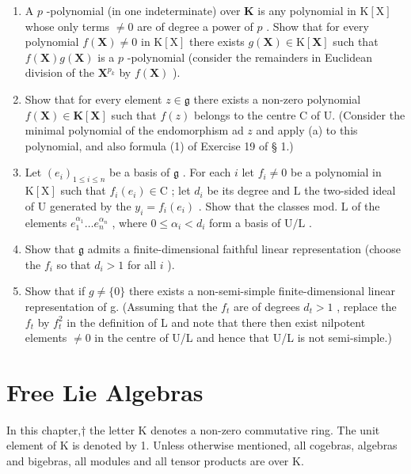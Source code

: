 \begin{enumerate}
\def\labelenumi{(\alph{enumi})}
\item
  A \(p\) -polynomial (in one indeterminate) over \(\mathbf{K}\) is any polynomial in \(\mathrm{K}[\mathrm{X}]\) whose only terms \(\neq 0\) are of degree a power of \(p\) . Show that for every polynomial \(f(\mathbf{X}) \neq 0\) in \(\mathrm{K}[\mathrm{X}]\) there exists \(g(\mathbf{X}) \in \mathrm{K}[\mathbf{X}]\) such that \(f(\mathbf{X})g(\mathbf{X})\) is a \(p\) -polynomial (consider the remainders in Euclidean division of the \(\mathbf{X}^{p_k}\) by \(f(\mathbf{X})\) ).
\item
  Show that for every element \(z \in \mathfrak{g}\) there exists a non-zero polynomial \(f(\mathbf{X}) \in \mathbf{K}[\mathbf{X}]\) such that \(f(z)\) belongs to the centre C of U. (Consider the minimal polynomial of the endomorphism ad \(z\) and apply (a) to this polynomial, and also formula (1) of Exercise 19 of § 1.)
\item
  Let \((e_i)_{1\leqslant i\leqslant n}\) be a basis of \(\mathfrak{g}\) . For each \(i\) let \(f_{i}\neq 0\) be a polynomial in \(\mathrm{K}[\mathrm{X}]\) such that \(f_{i}(e_{i})\in \mathrm{C}\) ; let \(d_{i}\) be its degree and \(\mathrm{L}\) the two-sided ideal of \(\mathrm{U}\) generated by the \(y_{i} = f_{i}(e_{i})\) . Show that the classes mod. \(\mathrm{L}\) of the elements \(e_1^{\alpha_1}\ldots e_n^{\alpha_n}\) , where \(0\leqslant \alpha_{i} < d_{i}\) form a basis of \(\mathrm{U / L}\) .
\item
  Show that \(\mathfrak{g}\) admits a finite-dimensional faithful linear representation (choose the \(f_{i}\) so that \(d_{i} > 1\) for all \(i\) ).
\item
  Show that if \(g \neq \{0\}\) there exists a non-semi-simple finite-dimensional linear representation of g. (Assuming that the \(f_{t}\) are of degrees \(d_{t} > 1\) , replace the \(f_{t}\) by \(f_{t}^{2}\) in the definition of L and note that there then exist nilpotent elements \(\neq 0\) in the centre of U/L and hence that U/L is not semi-simple.)
\end{enumerate}


\chapter{Free Lie Algebras}

In this chapter,† the letter K denotes a non-zero commutative ring. The unit element of K is denoted by 1. Unless otherwise mentioned, all cogebras, algebras and bigebras, all modules and all tensor products are over K.


